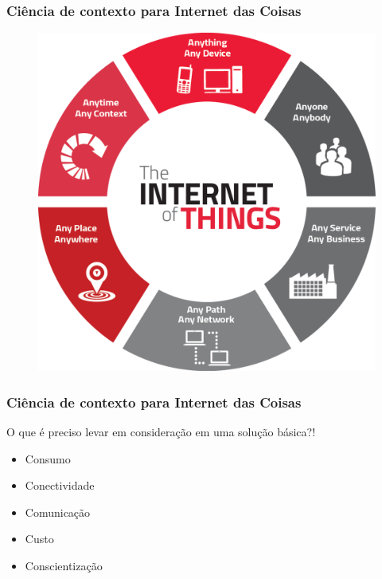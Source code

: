 \documentclass[t]{beamer}
\begin{document}
\begin{frame}
	\frametitle{Ciência de contexto para Internet das Coisas}
	\begin{figure}
		\centering
		\includegraphics[width=0.7\linewidth]{contextosdeiot}
	\end{figure}	
\end{frame}

\begin{frame}
	\frametitle{Ciência de contexto para Internet das Coisas}
	O que é preciso levar em consideração em uma solução básica?!
	\begin{itemize}
		\item Consumo
		\item Conectividade
		\item Comunicação
		\item Custo
		\item Conscientização
	\end{itemize}
\end{frame}

\frame{\titlepage}
\end{document}
